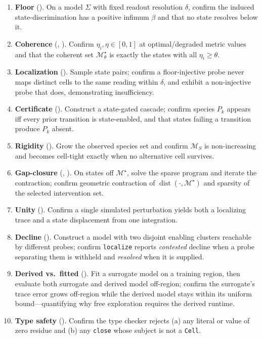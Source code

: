 \documentclass[11pt,a4paper]{article}
\theoremstyle{cfcthm}
\theoremstyle{definition}
\theoremstyle{remark}
\newcommand{\Man}{\mathcal{M}}          %
\newcommand{\Coh}{\Man^{\star}}         %
\newcommand{\flo}{\beta}                %
\newcommand{\ecoh}{\eta}                %
\newcommand{\dist}{\operatorname{dist}}
\newcommand{\cf}[1]{\texttt{#1}}
\begin{document}
\begin{enumerate}[leftmargin=1.6em,itemsep=3pt]
\item \textbf{Floor} (). On a model $\Sigma$ with fixed readout
resolution $\delta$, confirm the induced state-discrimination has a positive
infimum $\flo$ and that no state resolves below it.
\item \textbf{Coherence} (, ).
Confirm $\ecoh_i,\ecoh\in[0,1]$ at optimal/degraded metric values and that the
coherent set $\Coh_\theta$ is exactly the states with all
$\ecoh_i\ge\theta$.
\item \textbf{Localization} (). Sample state pairs;
confirm a floor-injective probe never maps distinct cells to the same reading
within $\delta$, and exhibit a non-injective probe that does, demonstrating
insufficiency.
\item \textbf{Certificate} (). Construct a state-gated
cascade; confirm species $P_k$ appears iff every prior transition is
state-enabled, and that states failing a transition produce $P_k$ absent.
\item \textbf{Rigidity} (). Grow the observed species set and
confirm $\Man_S$ is non-increasing and becomes cell-tight exactly when no
alternative cell survives.
\item \textbf{Gap-closure} (, ). On
states off $\Coh$, solve the sparse program and iterate the contraction; confirm
geometric contraction of $\dist(\cdot,\Coh)$ and sparsity of the selected
intervention set.
\item \textbf{Unity} (). Confirm a single simulated perturbation
yields both a localizing trace and a state displacement from one integration.
\item \textbf{Decline} (). Construct a model with two disjoint
enabling clusters reachable by different probes; confirm \cf{localize} reports
\emph{contested} decline when a probe separating them is withheld and
\emph{resolved} when it is supplied.
\item \textbf{Derived vs.\ fitted} (). Fit a surrogate model on
a training region, then evaluate both surrogate and derived model off-region;
confirm the surrogate's trace error grows off-region while the derived model
stays within its uniform bound---quantifying why free exploration requires the
derived runtime.
\item \textbf{Type safety} ().
Confirm the type checker rejects (a) any literal or value of zero residue and
(b) any \cf{close} whose subject is not a \cf{Cell}.
\end{enumerate}
\end{document}
